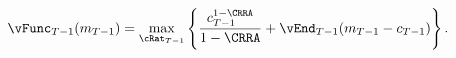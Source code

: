   \begin{equation}\begin{gathered}\begin{aligned}
    {\vFunc}_{T-1}({m}_{T-1})   & = \max_{\cRat_{T-1}}
                                     \left\{
                                     \frac{{c}_{T-1}^{1-\CRRA}}{1-\CRRA} +
                                     \vEnd_{T-1}({m}_{T-1}-{c}_{T-1})
                                     \right\}.
                                     \label{eq:vEndTm1}
  \end{aligned}\end{gathered}\end{equation}

